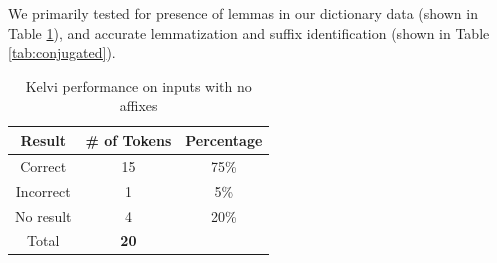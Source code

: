 \documentclass[11pt]{article}
\begin{document}
We primarily tested for presence of lemmas in our dictionary data (shown in Table \ref{tab:unconjugated}), 
and accurate lemmatization and suffix identification (shown in Table \ref{tab:conjugated}).
\begin{table}[ht]
  \center
  \begin{tabular}{c|c|c}
    Result & \# of Tokens & Percentage\\
    \hline
    Correct & 15 & 75\% \\
    Incorrect & 1 & 5\% \\
    No result & 4 & 20\% \\
    \hline
    Total & \textbf{20} & \\
  \end{tabular}
  \caption{Kelvi performance on inputs with no affixes}
  \label{tab:unconjugated}
  \vspace{-1.4em}
\end{table}
\end{document}
